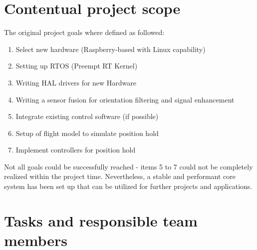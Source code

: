 
\section{Contentual project scope}
\label{sec:projGoals:projPlan:cententual}
The original project goals where defined as followed:
\begin{enumerate}
	\item Select new hardware (Raspberry-based with Linux capability) 
	\item Setting up RTOS (Preempt RT Kernel)
	\item Writing HAL drivers for new Hardware
	\item Writing a sensor fusion for orientation filtering and signal enhancement
	\item Integrate existing control software (if possible)
	\item Setup of flight model to simulate position hold
	\item Implement controllers for position hold
\end{enumerate}

Not all goals could be successfully reached - items 5 to 7 could not be completely realized within the project time. Nevertheless, a stable and performant core system has been set up that can be utilized for further projects and applications.

\section{Tasks and responsible team members}
\label{sec:projGoals:tasksAndMembers}

